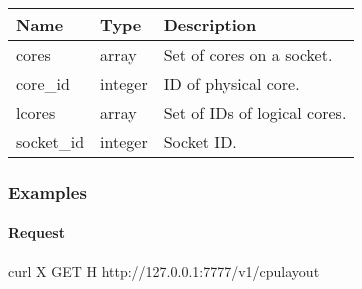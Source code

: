 \documentclass[a4paper,11pt,openany,oneside,english]{sphinxmanual}
\begin{document}
\begin{savenotes}\sphinxattablestart
\centering
{}
\sphinxthecaptionisattop
{}\label{\detokenize{api_ref/proc_independ:id13}}\label{\detokenize{api_ref/proc_independ:table-spp-ctl-cpu-layout-params}}
\sphinxaftertopcaption
\begin{tabulary}{\linewidth}[t]{|T|T|T|}
\hline
\sphinxstyletheadfamily 
Name
&\sphinxstyletheadfamily 
Type
&\sphinxstyletheadfamily 
Description
\\
\hline
cores
&
array
&
Set of cores on a socket.
\\
\hline
core\_id
&
integer
&
ID of physical core.
\\
\hline
lcores
&
array
&
Set of IDs of logical cores.
\\
\hline
socket\_id
&
integer
&
Socket ID.
\\
\hline
\end{tabulary}
\par
\sphinxattableend\end{savenotes}


\subsubsection{Examples}
\label{\detokenize{api_ref/proc_independ:id3}}

\paragraph{Request}
\label{\detokenize{api_ref/proc_independ:id4}}
\begin{sphinxVerbatim}[commandchars=\\\{\},formatcom=\footnotesize]
 curl \PYGZhy{}X GET \PYGZhy{}H  
http://127.0.0.1:7777/v1/cpu\PYGZus{}layout
\end{sphinxVerbatim}
\end{document}
